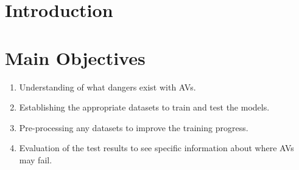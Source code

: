 \documentclass[a0,portrait]{a0poster}
\begin{document}
\begin{multicols}{2} %


	\color{ku} %

	\begin{abstract}

	\end{abstract}


	\color{DarkRed} %

	\section*{Introduction}

	

	\color{DarkSlateGray} %

	\section*{Main Objectives}
		\begin{enumerate}
			\item Understanding of what dangers exist with AVs.
			\item Establishing the appropriate datasets to train and test the models.
			\item Pre-processing any datasets to improve the training progress.
			\item Evaluation of the test results to see specific information about where AVs may fail.
		\end{enumerate}



\end{multicols}
\end{document}
